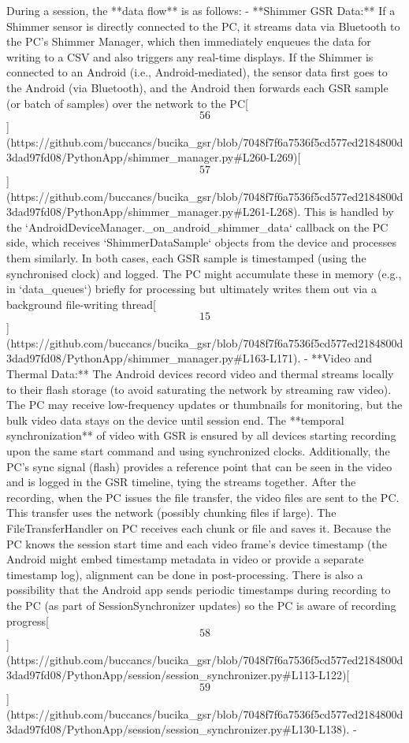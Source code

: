 \documentclass[12pt,a4paper]{article}
\begin{document}
During a session, the **data flow** is as follows: - **Shimmer GSR
Data:** If a Shimmer sensor is directly connected to the PC, it streams
data via Bluetooth to the PC's Shimmer Manager, which then immediately
enqueues the data for writing to a CSV and also triggers any real-time
displays. If the Shimmer is connected to an Android (i.e.,
Android-mediated), the sensor data first goes to the Android (via
Bluetooth), and the Android then forwards each GSR sample (or batch of
samples) over the network to the
PC[\[56\]](https://github.com/buccancs/bucika_gsr/blob/7048f7f6a7536f5cd577ed2184800d3dad97fd08/PythonApp/shimmer_manager.py#L260-L269)[\[57\]](https://github.com/buccancs/bucika_gsr/blob/7048f7f6a7536f5cd577ed2184800d3dad97fd08/PythonApp/shimmer_manager.py#L261-L268).
This is handled by the `AndroidDeviceManager._on_android_shimmer_data`
callback on the PC side, which receives `ShimmerDataSample` objects from
the device and processes them similarly. In both cases, each GSR sample
is timestamped (using the synchronised clock) and logged. The PC might
accumulate these in memory (e.g., in `data_queues`) briefly for
processing but ultimately writes them out via a background file-writing
thread[\[15\]](https://github.com/buccancs/bucika_gsr/blob/7048f7f6a7536f5cd577ed2184800d3dad97fd08/PythonApp/shimmer_manager.py#L163-L171). -
**Video and Thermal Data:** The Android devices record video and thermal
streams locally to their flash storage (to avoid saturating the network
by streaming raw video). The PC may receive low-frequency updates or
thumbnails for monitoring, but the bulk video data stays on the device
until session end. The **temporal synchronization** of video with GSR is
ensured by all devices starting recording upon the same start command
and using synchronized clocks. Additionally, the PC's sync signal
(flash) provides a reference point that can be seen in the video and is
logged in the GSR timeline, tying the streams together. After the
recording, when the PC issues the file transfer, the video files are
sent to the PC. This transfer uses the network (possibly chunking files
if large). The FileTransferHandler on PC receives each chunk or file and
saves it. Because the PC knows the session start time and each video
frame's device timestamp (the Android might embed timestamp metadata in
video or provide a separate timestamp log), alignment can be done in
post-processing. There is also a possibility that the Android app sends
periodic timestamps during recording to the PC (as part of
SessionSynchronizer updates) so the PC is aware of recording
progress[\[58\]](https://github.com/buccancs/bucika_gsr/blob/7048f7f6a7536f5cd577ed2184800d3dad97fd08/PythonApp/session/session_synchronizer.py#L113-L122)[\[59\]](https://github.com/buccancs/bucika_gsr/blob/7048f7f6a7536f5cd577ed2184800d3dad97fd08/PythonApp/session/session_synchronizer.py#L130-L138). -
\end{document}
